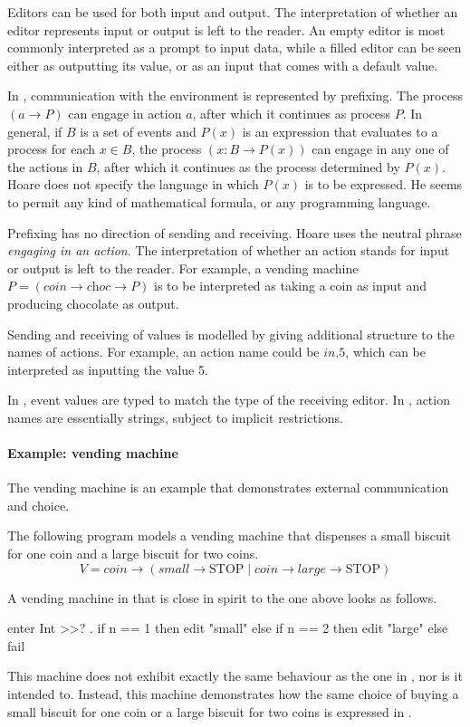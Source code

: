 Editors can be used for both input and output.
The interpretation of whether an editor represents input or output is left to the reader.
An empty editor is most commonly interpreted as a prompt to input data, while a filled editor can be seen either as outputting its value, or as an input that comes with a default value.

In \CSP, communication with the environment is represented by prefixing.
The process $(a \to P)$ can engage in action $a$, after which it continues as process $P$.
In general, if $B$ is a set of events and $P(x)$ is an expression that evaluates to a process for each $x \in B$, the process $(x:B \to P(x))$ can engage in any one of the actions in $B$, after which it continues as the process determined by $P(x)$.
Hoare does not specify the language in which $P(x)$ is to be expressed.
He seems to permit any kind of mathematical formula, or any programming language.

Prefixing has no direction of sending and receiving.
Hoare uses the neutral phrase \emph{engaging in an action}.
The interpretation of whether an action stands for input or output is left to the reader.
For example, a vending machine $P = (\textit{coin} \to \textit{choc} \to P)$ is to be interpreted as taking a coin as input and producing chocolate as output.

Sending and receiving of values is modelled by giving additional structure to the names of actions.
For example, an action name could be $\textit{in}.5$, which can be interpreted as inputting the value 5.

In \TOP, event values are typed to match the type of the receiving editor.
In \CSP, action names are essentially strings, subject to implicit restrictions.


\paragraph{Example: vending machine}

The vending machine is an example that demonstrates external communication and choice.

The following \CSP program models a vending machine that dispenses a small biscuit for one coin and a large biscuit for two coins. $$V = \textit{coin} \to (\textit{small} \to \text{STOP} \mid \textit{coin} \to \textit{large} \to \text{STOP})$$

A vending machine in \TOP that is close in spirit to the one above looks as follows.
\begin{TASK}
  enter Int >>? \n.
    if n == 1 then edit "small" else
    if n == 2 then edit "large" else fail
\end{TASK}
This machine does not exhibit exactly the same behaviour as the one in \CSP, nor is it intended to.
Instead, this machine demonstrates how the same choice of buying a small biscuit for one coin or a large biscuit for two coins is expressed in \TOP.

